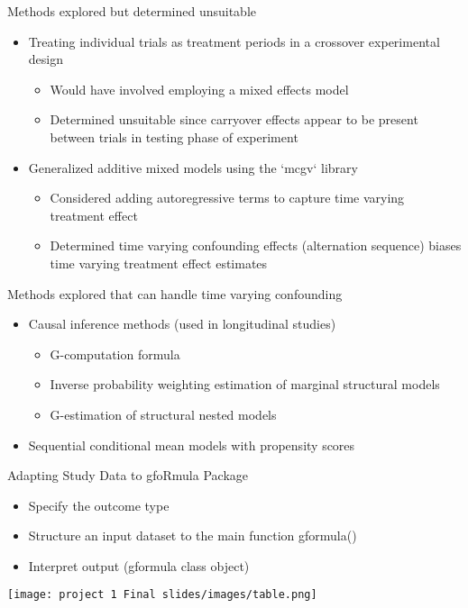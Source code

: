\documentclass[
]{beamer}
\begin{document}
\begin{frame}{Methods explored but determined unsuitable}
\begin{itemize}
    \item Treating individual trials as treatment periods in a crossover experimental design
	\begin{itemize}
		\item Would have involved employing a mixed effects model
		\item Determined unsuitable since carryover effects appear to be present between trials in testing phase of experiment
	\end{itemize}
    \item Generalized additive mixed models using the `mcgv` library
	\begin{itemize}
		\item Considered adding autoregressive terms to capture time varying treatment effect
		\item Determined time varying confounding effects (alternation sequence) biases time varying treatment effect estimates
	\end{itemize}
\end{itemize}
\end{frame}


\begin{frame}{Methods explored that can handle time varying confounding}
\begin{itemize}
    \item Causal inference methods (used in longitudinal studies)
	\begin{itemize}
		\item G-computation formula
		\item Inverse probability weighting estimation of marginal structural models
	 	\item G-estimation of structural nested models
	\end{itemize}
    \item Sequential conditional mean models with propensity scores
\end{itemize}
\end{frame}



\begin{frame}{Adapting Study Data to gfoRmula Package}
\begin{itemize}
    \item Specify the outcome type 
    \item Structure an input dataset to the main function gformula()
    \item Interpret output (gformula class object)
\end{itemize}
\centering
\texttt{[image: project 1 Final slides/images/table.png]}
\end{frame}
\end{document}
